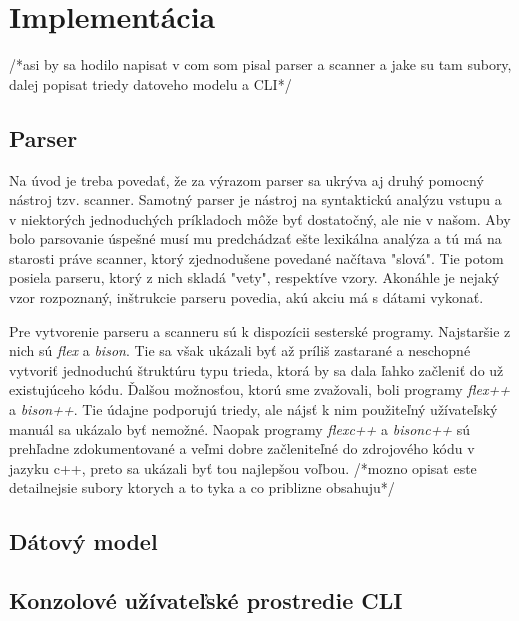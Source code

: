 \documentclass[11pt,final,oneside]{fithesis}
\begin{document}
\chapter{Implement\' acia}
/*asi by sa hodilo napisat v com som pisal parser a scanner a jake su tam subory, dalej popisat triedy datoveho modelu a CLI*/

\section{Parser}
Na \'uvod je treba poveda\v t, \v ze za v\'yrazom parser sa ukr\'yva aj druh\'y pomocn\'y n\'astroj tzv. scanner. Samotn\'y parser je n\'astroj na syntaktick\'u 
anal\'yzu vstupu a v niektor\'ych jednoduch\'ych pr\'ikladoch m\^ o\v ze by\v t dostato\v cn\'y, ale nie v na\v som. Aby bolo parsovanie \'uspe\v sn\'e mus\'i
mu predch\'adza\v t e\v ste lexik\'alna anal\'yza a t\'u m\'a na starosti pr\'ave scanner, ktor\'y zjednodu\v sene povedan\'e na\v c\'itava "slov\'a". Tie potom
posiela parseru, ktor\'y z nich sklad\'a "vety", respekt\'ive vzory. Akon\'ahle je nejak\'y vzor rozpoznan\'y, in\v strukcie parseru povedia, ak\'u akciu
m\'a s d\'atami vykona\v t.

Pre vytvorenie parseru a scanneru s\'u k dispoz\'icii sestersk\'e programy. Najstar\v sie z nich s\'u {\it flex} a {\it bison}. Tie sa v\v sak uk\'azali by\v t
a\v z pr\'ili\v s zastaran\'e a neschopn\'e vytvori\v t jednoduch\'u \v strukt\'uru typu trieda, ktor\'a by sa dala \v lahko za\v cleni\v t do u\v z 
existuj\'uceho k\'odu. \v Dal\v sou mo\v znos\v tou, ktor\'u sme zva\v zovali, boli programy {\it flex++} a {\it bison++}. Tie \'udajne podporuj\'u triedy, 
ale n\'ajs\v t k nim pou\v zite\v ln\'y u\v z\'ivate\v lsk\'y manu\'al sa uk\'azalo by\v t nemo\v zn\'e. Naopak programy {\it flexc++} \cite{flexc++} a 
{\it bisonc++} \cite{bisonc++} s\'u preh\v ladne zdokumentovan\'e a ve\v lmi dobre za\v clenite\v ln\'e do zdrojov\'eho k\'odu v jazyku c++, preto sa 
uk\'azali by\v t tou najlep\v sou vo\v lbou.
/*mozno opisat este detailnejsie subory ktorych a to tyka a co priblizne obsahuju*/

\section{D\'atov\'y model}

\section{Konzolov\'e u\v z\'ivate\v lsk\'e prostredie CLI}
\end{document}
